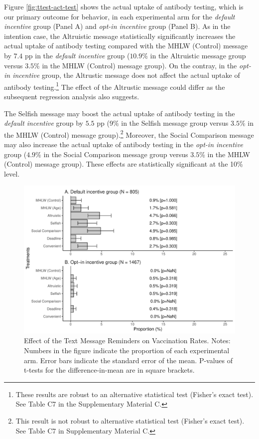 \documentclass[
      12pt,
    a4paper
]{article}
\begin{document}
Figure \ref{fig:ttest-act-test} shows the actual uptake of antibody testing, which is our primary outcome for behavior, in each experimental arm for the \emph{default incentive} group (Panel A) and \emph{opt-in incentive} group (Panel B). As in the intention case, the Altruistic message statistically significantly increases the actual uptake of antibody testing compared with the MHLW (Control) message by \(7.4\) pp in the \emph{default incentive} group (\(10.9\)\% in the Altruistic message group versus \(3.5\)\% in the MHLW (Control) message group). On the contray, in the \emph{opt-in incentive} group, the Altrustic message does not affect the actual uptake of antibody testing.\footnote{These results are robust to an alternative statistical test (Fisher's exact test). See Table C7 in the Supplementary Material C.} The effect of the Altrustic message could differ as the subsequent regression analysis also suggests.

The Selfish message may boost the actual uptake of antibody testing in the \emph{default incentive} group by \(5.5\) pp (9\% in the Selfish message group versus \(3.5\)\% in the MHLW (Control) message group).\footnote{This result is not robust to alternative statistical test (Fisher's exact test). See Table C7 in Supplementary Material C.} Moreover, the Social Comparison message may also increase the actual uptake of antibody testing in the \emph{opt-in incentive} group (\(4.9\)\% in the Social Comparison message group versus \(3.5\)\% in the MHLW (Control) message group). These effects are statistically significant at the 10\% level.

\begin{figure}[t]
\includegraphics{Main-Document-LaTeX_files/figure-latex/ttest-act-vacc-1} \caption{Effect of the Text Message Reminders on Vaccination Rates. Notes: Numbers in the figure indicate the proportion of each experimental arm. Error bars indicate the standard error of the mean. P-values of t-tests for the difference-in-mean are in square brackets.}\label{fig:ttest-act-vacc}
\end{figure}
\end{document}

